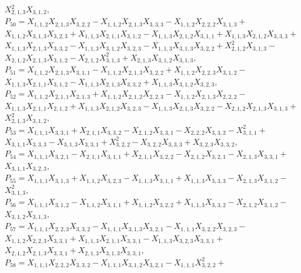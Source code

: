 \documentclass[10pt]{beamer}
\begin{document}
$X_{2,1,3}^2X_{3,1,2},$\\
$P_{50}=X_{1,1,2}X_{2,1,3}X_{3,2,2}-X_{1,1,2}X_{2,1,3}X_{3,3,3}-X_{1,1,2}X_{2,2,2}X_{3,1,3}+$\\
$X_{1,1,2}X_{3,1,3}X_{3,2,3}+X_{1,1,3}X_{2,1,1}X_{3,1,2}-X_{1,1,3}X_{2,1,2}X_{3,1,1}+X_{1,1,3}X_{2,1,2}X_{3,3,3}+$\\
$X_{1,1,3}X_{2,1,3}X_{3,3,2}-X_{1,1,3}X_{3,1,2}X_{3,2,3}-X_{1,1,3}X_{3,1,3}X_{3,2,2}+X_{2,1,2}^2X_{3,1,3}-$\\
$X_{2,1,2}X_{2,1,3}X_{3,1,2}-X_{2,1,2}X_{3,1,3}^2+X_{2,1,3}X_{3,1,2}X_{3,1,3},$\\
$P_{51}=X_{1,1,2}X_{2,1,3}X_{3,1,1}-X_{1,1,2}X_{2,1,3}X_{3,2,2}+X_{1,1,2}X_{2,2,3}X_{3,1,2}-$\\
$X_{1,1,3}X_{2,1,1}X_{3,1,2}-X_{1,1,3}X_{2,1,3}X_{3,3,2}+X_{1,1,3}X_{3,1,2}X_{3,2,3},$\\
$P_{52}=X_{1,1,2}X_{2,1,1}X_{2,1,3}+X_{1,1,2}X_{2,1,2}X_{2,2,3}-X_{1,1,2}X_{2,1,3}X_{2,2,2}-$\\
$X_{1,1,3}X_{2,1,1}X_{2,1,2}+X_{1,1,3}X_{2,1,2}X_{3,2,3}-X_{1,1,3}X_{2,1,3}X_{3,2,2}-X_{2,1,2}X_{2,1,3}X_{3,1,3}+$\\
$X_{2,1,3}^2X_{3,1,2},$\\
$P_{53}=X_{1,1,1}X_{3,3,1}+X_{2,1,1}X_{3,3,2}-X_{2,1,2}X_{3,3,1}-X_{2,2,2}X_{3,3,2}-X_{3,1,1}^2+$\\
$X_{3,1,1}X_{3,3,3}-X_{3,1,3}X_{3,3,1}+X_{3,2,2}^2-X_{3,2,2}X_{3,3,3}+X_{3,2,3}X_{3,3,2},$\\
$P_{54}=X_{1,1,1}X_{3,2,1}-X_{2,1,1}X_{3,1,1}+X_{2,1,1}X_{3,2,2}-X_{2,1,2}X_{3,2,1}-X_{2,1,3}X_{3,3,1}+$\\
$X_{3,1,1}X_{3,2,3},$\\
$P_{55}=X_{1,1,1}X_{3,1,3}+X_{1,1,2}X_{3,2,3}-X_{1,1,3}X_{3,1,1}+X_{1,1,3}X_{3,3,3}-X_{2,1,3}X_{3,1,2}-$\\
$X_{3,1,3}^2,$\\
$P_{56}=X_{1,1,1}X_{3,1,2}-X_{1,1,2}X_{3,1,1}+X_{1,1,2}X_{3,2,2}+X_{1,1,3}X_{3,3,2}-X_{2,1,2}X_{3,1,2}-$\\
$X_{3,1,2}X_{3,1,3},$\\
$P_{57}=X_{1,1,1}X_{2,2,3}X_{3,3,2}-X_{1,1,1}X_{3,1,3}X_{3,2,1}-X_{1,1,1}X_{3,2,2}X_{3,2,3}-$\\
$X_{1,1,2}X_{2,2,3}X_{3,3,1}+X_{1,1,3}X_{2,1,1}X_{3,3,1}-X_{1,1,3}X_{3,2,3}X_{3,3,1}+$\\
$X_{2,1,2}X_{2,1,3}X_{3,3,1}+X_{2,1,3}X_{3,1,3}X_{3,3,1},$\\
$P_{58}=X_{1,1,1}X_{2,2,2}X_{3,3,2}-X_{1,1,1}X_{3,1,2}X_{3,2,1}-X_{1,1,1}X_{3,2,2}^2+$\\
\end{document}
